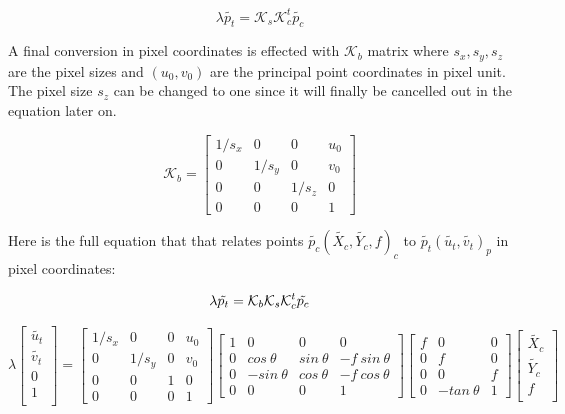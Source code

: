 \documentclass[12pt]{article}
\begin{document}
\begin{equation}  
\lambda \tilde{p_t} = \mathcal{K}_{s}\mathcal{K}_{c}^t\tilde{p_{c}}
\label{eqn:sch1}
\end{equation}


A final conversion in pixel coordinates is effected with $\mathcal{K}_{b}$ matrix where $s_x,s_y,s_z$ are the pixel sizes and $(u_{0},v_{0})$ are the principal point coordinates in pixel unit. The pixel size $s_z$ can be changed to one since it will finally be cancelled out in the equation later on.

\begin{equation}  
\mathcal{K}_b=\begin{bmatrix}
1/s_x & 0 & 0&u_{0} \\
0 & 1/s_y & 0& v_{0} \\
0 & 0 & 1/s_z&0 \\
0& 0 & 0 & 1 
\end{bmatrix} 
\label{eqn:Ab3}
\end{equation}

Here is the full equation that that relates points $\tilde{p_{c}} (\tilde{X_c},\tilde{Y_c},f)_c$ to $\tilde{p_t}(\tilde{u_t},\tilde{v_t})_p$ in pixel coordinates:

\begin{equation}  
\lambda \tilde{p_t} = \mathcal{K}_{b} \mathcal{K}_{s}\mathcal{K}_{c}^t\tilde{p_{c}}\\
\label{eqn:sch1}
\end{equation}

\begin{equation}  
\lambda  \begin{bmatrix}
\tilde{u_t}\\
\tilde{v_t}\\
0\\
1\\
\end{bmatrix} =\begin{bmatrix}
1/s_x & 0 & 0&u_{0} \\
0 & 1/s_y & 0& v_{0} \\
0 & 0 & 1&0 \\
0& 0 & 0 & 1 
\end{bmatrix} \begin{bmatrix}
1& 0 & 0&0 \\
0 & cos~\theta & sin~\theta  & -f~sin~\theta \\
0 & -sin~\theta & cos~\theta&-f~cos~\theta\\
0 & 0 & 0 & 1
\end{bmatrix} \begin{bmatrix}
f & 0 & 0\\
0 & f & 0 \\
0 & 0 & f\\
0 & -tan~\theta & 1 
\end{bmatrix} \begin{bmatrix}
\tilde{X_c}\\
\tilde{Y_c}\\
f\\
\end{bmatrix}
\label{eqn:sch28}
\end{equation}
\end{document}
